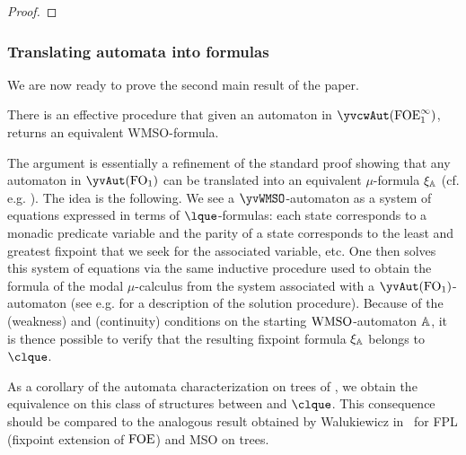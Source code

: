 \begin{proof}
%
\end{proof}


\subsubsection{Translating automata into formulas}
We are now ready to prove the second main result of the paper.

\begin{theorem}\label{thm:wmso_autofor}
There is an effective procedure that given an automaton in $\yvcwAut({\olque})$, returns an equivalent WMSO-formula.
\end{theorem}
\begin{proofsketch}
The argument   is
 essentially a refinement of the standard proof showing that any automaton in $\yvAut(\ofo)$ can be translated into an equivalent $\mu$-formula
$\xi_\mathbb{A}$ (cf. e.g. \cite{Ven08}).
The idea is the following. We see a $\yvWMSO$-automaton as a system of equations expressed in terms of $\lque$-formulas: each state corresponds to a monadic predicate variable and the parity of a state corresponds to the least and greatest fixpoint that we seek for the associated variable, etc. One then solves this system of equations via the same inductive procedure used to obtain the formula of the modal $\mu$-calculus from the system associated with a  $\yvAut(\ofo)$-automaton (see e.g. \cite{ArnoldN01} for a description of the solution procedure). Because of the (weakness) and (continuity) conditions on the starting $\mathrm{WMSO}$-automaton $\mathbb{A}$, it is thence possible to verify that the resulting fixpoint formula $\xi_\mathbb{A}$ belongs to $\clque$.
\end{proofsketch}

\begin{remark}
As a corollary of the automata characterization on trees of \wmso, we obtain the equivalence on this class of structures between \wmso and $\clque$. This consequence should be compared to the analogous result obtained by Walukiewicz in~\cite{Walukiewicz96} for FPL (fixpoint extension of $\mathrm{FOE}$) and MSO on trees.
\end{remark}

